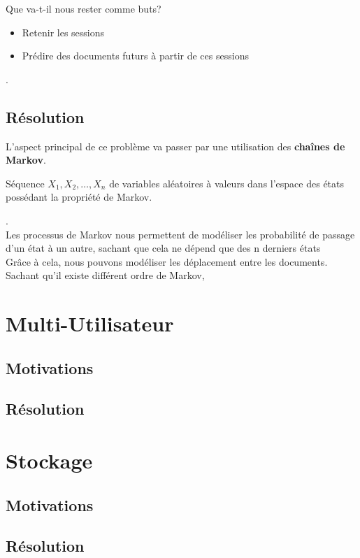             Que va-t-il nous rester comme buts?
            \begin{itemize}
                \item Retenir les sessions
                \item Prédire des documents futurs à partir de ces sessions
            \end{itemize}.\\
        \subsection{Résolution}
            L'aspect principal de ce problème va passer par une utilisation des \textbf{chaînes de Markov}.\\
            \begin{center}
                Séquence $X_1, X_2, \ldots , X_n$ de variables aléatoires à valeurs dans l’espace des états possédant la propriété de Markov.
            \end{center}.\\

            Les processus de Markov nous permettent de modéliser les probabilité de passage d'un état à un autre, sachant que cela ne dépend que des n derniers états\\
            Grâce à cela, nous pouvons modéliser les déplacement entre les documents. Sachant qu'il existe différent ordre de Markov, 


    \section{Multi-Utilisateur}
        \subsection{Motivations}
        \subsection{Résolution}
    \section{Stockage}
        \subsection{Motivations}
        \subsection{Résolution}
